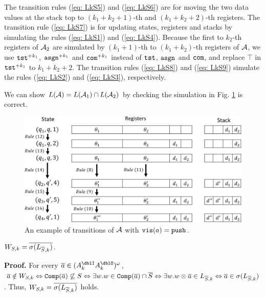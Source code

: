 The transition rules (\ref{eq: LkS5}) and (\ref{eq: LkS6})
are for moving the two data values at the stack top
to $(k_1+k_2+1)$-th and $(k_1+k_2+2)$-th registers.
The transition rule (\ref{eq: LkS7})
is for updating states, registers and stacks
by simulating the rules (\ref{eq: LkS1}) and (\ref{eq: LkS4}).
Because the first to $k_2$-th registers of ${\cal A}_2$ are simulated by $(k_1+1)$-th to $(k_1+k_2)$-th registers of ${\cal A}$,
we use $\mathtt{tst}^{+k_1}$, $\mathtt{asgn}^{+k_1}$ and $\mathtt{com}^{+k_1}$
instead of $\mathtt{tst}$, $\mathtt{asgn}$ and $\mathtt{com}$, and
replace $\top$ in $\mathtt{tst}^{+k_1}$ to $k_1+k_2+2$.
The transition rules (\ref{eq: LkS8}) and (\ref{eq: LkS9})
simulate the rules (\ref{eq: LkS2}) and (\ref{eq: LkS3}), respectively.

We can show $L({\cal A})=L({\cal A}_1)\cap L({\cal A}_2)$
by checking the simulation in Fig. \ref{fig: lem_LkS}
is correct.

\begin{figure}[t]
  \centering
  \includegraphics[width=12cm]{lem_LkS.png}
  \caption{An example of transitions of ${\cal A}$ with $\mathtt{vis}(a)=\mathtt{push}$.}
  \label{fig: lem_LkS}
\end{figure}

\begin{lemma} \label{lem: W=lab}
$W_{S,k} = \overline{\sigma(L_{{\overline{S}},k})}$.
\end{lemma}
{\bf Proof.}\quad
For every $\overa\in(A_k^\dblI A_k^\dblO)^\omega$,
${\overline{a}}\notin W_{S,k} \Leftrightarrow {\mathtt{Comp}}({\overline{a}})\not\subseteq S
\Leftrightarrow \exists w. w\in {\mathtt{Comp}}({\overline{a}})\cap {\overline{S}}
\Leftrightarrow \exists w. w\otimes{\overline{a}}\in L_{{\overline{S}},k}
\Leftrightarrow {\overline{a}}\in\sigma(L_{{\overline{S}},k})$.
Thus, $W_{S,k} = \overline{\sigma(L_{{\overline{S}},k})}$ holds.

